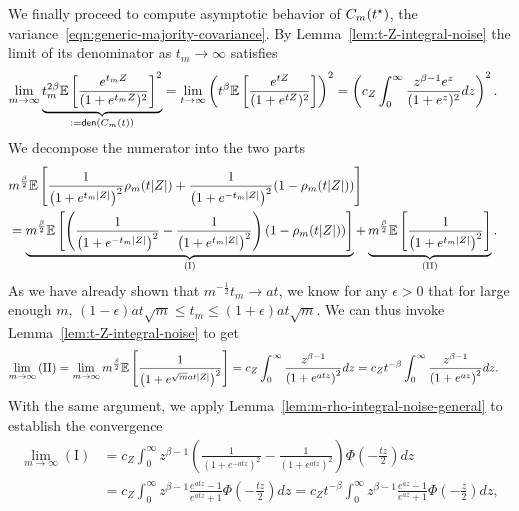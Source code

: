 We finally proceed to compute asymptotic behavior of $C_m(t^\star)$, the
variance~\eqref{eqn:generic-majority-covariance}. By
Lemma~\ref{lem:t-Z-integral-noise} the limit of its denominator as $t_m \to
\infty$ satisfies
\begin{align*}
  \lim_{m \to \infty}
  \underbrace{t_m^{2 \beta}
    \mathbb{E}\left[\frac{e^{t_m Z} }{ (1 + e^{t_m Z})^2}\right]^2}_{
    :=\mathsf{den}(C_m(t))}
  & = \lim_{t \to \infty} \left( t^\beta \mathbb{E}\left[\frac{e^{t Z} }{ (1 + e^{t Z})^2}\right]\right)^2 =
  \left(c_Z\int_{0}^\infty \frac{z^{\beta - 1} e^{z} }{ (1 + e^{z})^2} dz\right)^2.
\end{align*}
We decompose the numerator into the two parts
\begin{align*}
  \lefteqn{m^{\frac{\beta}{2}} \Ep \left[\frac{1}{\left(1 + e^{t_m|Z|}\right)^2} \rho_m(t |Z|) + \frac{1}{\left(1 + e^{-t_m|Z|}\right)^2} (1-\rho_m(t|Z|)) \right]} \nonumber \\
  & = \underbrace{m^{\frac{\beta}{2}} \Ep \left[\left(\frac{1}{\left(1 + e^{-t_m|Z|}\right)^2} - \frac{1}{\left(1 + e^{t_m|Z|}\right)^2} \right)(1-\rho_m(t|Z|)) \right]}_{\mathrm{(I)}} + \underbrace{m^{\frac{\beta}{2}} \Ep \left[\frac{1}{\left(1 + e^{t_m|Z|}\right)^2}\right]}_{\mathrm{(II)}}  .
\end{align*}
As we have already shown that $m^{-\frac{1}{2}} t_m \to at$, we know for any
$\epsilon > 0$ that for large enough $m$, $(1-\epsilon) a t \sqrt m
\leq t_m \leq (1 +\epsilon) at \sqrt{m}$. We can thus invoke
Lemma~\ref{lem:t-Z-integral-noise} to get
\begin{align*}
  \lim_{m \to \infty}  \mathrm{(II)} = \lim_{m \to \infty} m^{\frac \beta 2} \Ep \left[\frac{1}{\left(1 + e^{\sqrt m at|Z|}\right)^2}\right] &  = c_Z \int_0^\infty  \frac{z^{\beta - 1}}{\left(1 + e^{a t z}\right)^2} dz  = c_Z {t}^{-\beta} \int_0^\infty \frac{z^{\beta - 1}}{\left(1 + e^{a z}\right)^2} dz  . %
\end{align*}
With the same argument, we apply Lemma~\ref{lem:m-rho-integral-noise-general}
to establish the convergence
\begin{align*}
  \lim_{m \to \infty} \mathrm{(I)} 
  & = c_Z \int_0^\infty z^{\beta - 1}\left(\frac{1}{\left(1 + e^{-a tz}\right)^2} - \frac{1}{\left(1 + e^{a t z}\right)^2} \right) \Phi \left(-\frac{tz}{2}\right) dz \\
  & = c_Z \int_0^\infty z^{\beta - 1}\frac{e^{a tz} - 1}{e^{a t z} + 1} \Phi \left(-\frac{tz}{2}\right) dz
  = c_Z {t}^{-\beta} \int_0^\infty z^{\beta - 1}\frac{e^{a z} - 1}{e^{a z} + 1} \Phi \left(-\frac{z}{2}\right) dz    , %
\end{align*}
